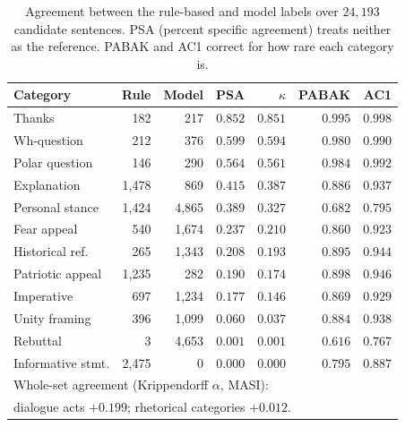 \documentclass[pdflatex,sn-apa]{sn-jnl}%
\begin{document}
\begin{table}[!htbp]
\caption{Agreement between the rule-based and model labels over $24{,}193$
candidate sentences. PSA (percent specific agreement) treats neither as
the reference. PABAK and AC1 correct for how rare each category is.}
\label{s:tab:kappa}
\centering
\footnotesize
\setlength{\tabcolsep}{3pt}
\begin{tabular}{lrrrrrr}
\toprule
Category & Rule & Model & PSA & $\kappa$ & PABAK & AC1 \\
\midrule
Thanks            & 182   & 217   & $0.852$ & $0.851$ & $0.995$ & $0.998$ \\
Wh-question       & 212   & 376   & $0.599$ & $0.594$ & $0.980$ & $0.990$ \\
Polar question    & 146   & 290   & $0.564$ & $0.561$ & $0.984$ & $0.992$ \\
Explanation       & 1{,}478 & 869 & $0.415$ & $0.387$ & $0.886$ & $0.937$ \\
Personal stance   & 1{,}424 & 4{,}865 & $0.389$ & $0.327$ & $0.682$ & $0.795$ \\
Fear appeal       & 540   & 1{,}674 & $0.237$ & $0.210$ & $0.860$ & $0.923$ \\
Historical ref.   & 265   & 1{,}343 & $0.208$ & $0.193$ & $0.895$ & $0.944$ \\
Patriotic appeal  & 1{,}235 & 282  & $0.190$ & $0.174$ & $0.898$ & $0.946$ \\
Imperative        & 697   & 1{,}234 & $0.177$ & $0.146$ & $0.869$ & $0.929$ \\
Unity framing     & 396   & 1{,}099 & $0.060$ & $0.037$ & $0.884$ & $0.938$ \\
Rebuttal          & 3     & 4{,}653 & $0.001$ & $0.001$ & $0.616$ & $0.767$ \\
Informative stmt. & 2{,}475 & 0    & $0.000$ & $0.000$ & $0.795$ & $0.887$ \\
\midrule
\multicolumn{7}{l}{Whole-set agreement (Krippendorff $\alpha$, MASI):} \\
\multicolumn{7}{l}{dialogue acts $+0.199$; rhetorical categories $+0.012$.} \\
\bottomrule
\end{tabular}
\end{table}
\end{document}
